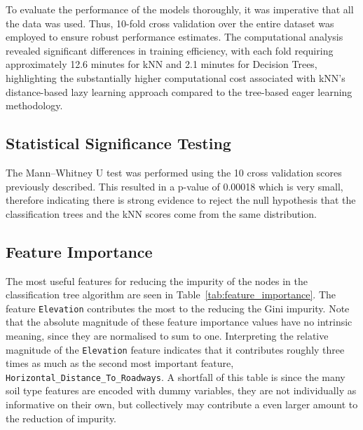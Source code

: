 \documentclass[10pt, conference]{IEEEtran}
\begin{document}
To evaluate the performance of the models thoroughly, it was imperative that all the data was used. Thus, 10-fold cross validation over the entire dataset was employed to ensure robust performance estimates. The computational analysis revealed significant differences in training efficiency, with each fold requiring approximately 12.6 minutes for kNN and 2.1 minutes for Decision Trees, highlighting the substantially higher computational cost associated with kNN's distance-based lazy learning approach compared to the tree-based eager learning methodology.

\subsection{Statistical Significance Testing}
The Mann–Whitney U test \cite{mann1947test} was performed using the 10 cross validation scores previously described. This resulted in a p-value of 0.00018 which is very small, therefore indicating there is strong evidence to reject the null hypothesis that the classification trees and the kNN scores come from the same distribution.

\subsection{Feature Importance}
The most useful features for reducing the impurity of the nodes in the classification tree algorithm are seen in Table~\ref{tab:feature_importance}. The feature \texttt{Elevation} contributes the most to the reducing the Gini impurity. Note that the absolute magnitude of these feature importance values have no intrinsic meaning, since they are normalised to sum to one. Interpreting the relative magnitude of the \texttt{Elevation} feature indicates that it contributes roughly three times as much as the second most important feature, \texttt{Horizontal\_Distance\_To\_Roadways}. A shortfall of this table is since the many soil type features are encoded with dummy variables, they are not individually as informative on their own, but collectively may contribute a even larger amount to the reduction of impurity. 
\end{document}
